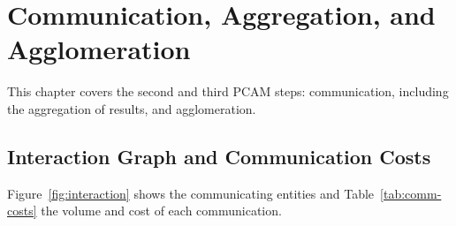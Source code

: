 \documentclass[a4paper,12pt]{report}
\begin{document}
\chapter{Communication, Aggregation, and Agglomeration}
\label{chap:comm}

This chapter covers the second and third PCAM steps: communication, including the
aggregation of results, and agglomeration.

\section{Interaction Graph and Communication Costs}
\label{sec:interaction}

Figure~\ref{fig:interaction} shows the communicating entities and
Table~\ref{tab:comm-costs} the volume and cost of each communication.
\end{document}
